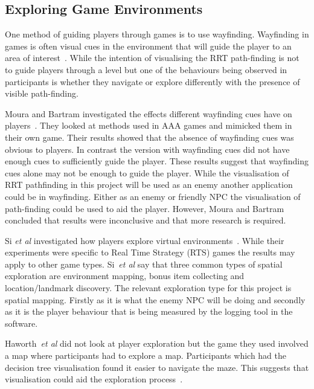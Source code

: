 \documentclass[journal]{IEEEtran}
\begin{document}


\subsection{Exploring Game Environments}
One method of guiding players through games is to use wayfinding. Wayfinding in games is often visual cues in the environment that will guide the player to an area of interest~\cite{si2017, Bacim2008}. While the intention of visualising the RRT path-finding is not to guide players through a level but one of the behaviours being observed in participants is whether they  navigate or explore differently with the presence of visible path-finding. 

Moura and Bartram investigated the effects different wayfinding cues have on players~\cite{moura2014}.  They looked at methods used in AAA games and mimicked them in their own game. Their results showed that the absence of wayfinding cues was obvious to players. In contrast the version with wayfinding cues did not have enough cues to sufficiently guide the player. These results suggest that wayfinding cues alone may not be enough to guide the player. While the visualisation of RRT pathfinding in this project will be used as an enemy another application could be in wayfinding. Either as an enemy or friendly NPC the visualisation of path-finding could be used to aid the player. However, Moura and Bartram concluded that results were inconclusive and that more research is required. 
 
Si \textit{et al} investigated how players explore virtual environments~\cite{si2017}. While their experiments were specific to Real Time Strategy (RTS) games the results may apply to other game types. Si~\textit{et al} say that three common types of spatial exploration are environment mapping, bonus item collecting and location/landmark discovery. The relevant exploration type for this project is spatial mapping. Firstly as it is what the enemy NPC will be doing and secondly as it is the player behaviour that is being measured by the logging tool in the software.

Haworth~\textit{et al} did not look at player exploration but the game they used involved a map where participants had to explore a map. Participants which had the decision tree visualisation found it easier to navigate the maze. This suggests that visualisation could aid the exploration process~\cite{Haworth2010}. 
\end{document}
